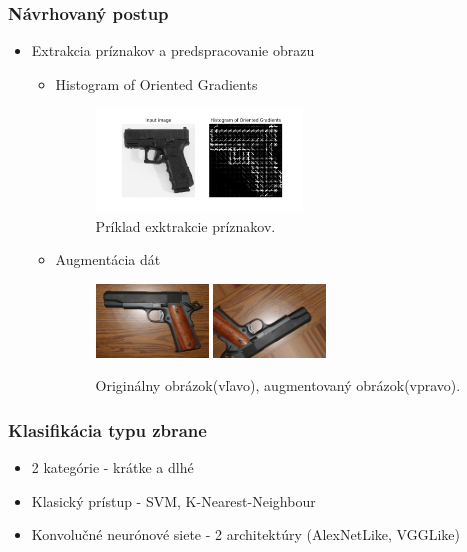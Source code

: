 \documentclass[10pt,xcolor=pdflatex]{beamer}
\begin{document}
\begin{frame}\frametitle{Návrhovaný postup}
    \begin{itemize}
        \item Extrakcia príznakov a predspracovanie obrazu
        \begin{itemize}
            \item Histogram of Oriented Gradients

            \begin{figure}[H]
                \centering
                \includegraphics[width=0.55\textwidth]{img/hog}
                \caption{Príklad exktrakcie príznakov.}
            \end{figure}

            \item Augmentácia dát

            \begin{figure}[H]
                \centering
                \includegraphics[width=0.3\textwidth]{img/weapon}
                \qquad
                \includegraphics[width=0.30\textwidth]{img/weapon-augmented}
                \caption{Originálny obrázok(vľavo), augmentovaný obrázok(vpravo).}
            \end{figure}
        \end{itemize}
    \end{itemize}
\end{frame}

\begin{frame}\frametitle{Klasifikácia typu zbrane}
    \begin{itemize}
        \item 2 kategórie - krátke a dlhé
        \vspace{0.3cm}
        \item Klasický prístup - SVM, K-Nearest-Neighbour
        \vspace{0.1cm}
        \item Konvolučné neurónové siete - 2 architektúry (AlexNetLike, VGGLike)
    \end{itemize}
\end{frame}
\end{document}
